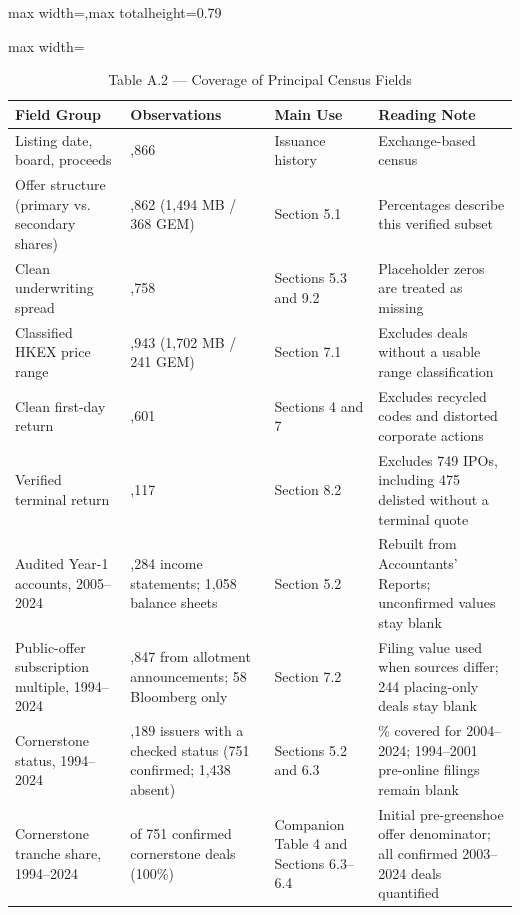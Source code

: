 \documentclass[11pt,letterpaper]{article}
\begin{document}
\begin{table}[!htbp]
\centering
\caption*{Table A.2 — Coverage of Principal Census Fields}
\begin{adjustbox}{max width=\textwidth,max totalheight=0.79\textheight}
\begin{minipage}{\textwidth}\centering
\footnotesize
\setlength{\tabcolsep}{3.5pt}
\renewcommand{\arraystretch}{1.18}
\begin{adjustbox}{max width=\textwidth}
\begin{tabular}{>{\raggedright\arraybackslash}p{3.97cm}>{\centering\arraybackslash}p{4.35cm}>{\raggedright\arraybackslash}p{3.13cm}>{\raggedright\arraybackslash}p{4.35cm}}
\toprule
Field Group & Observations & Main Use & Reading Note \\
\midrule
Listing date, board, proceeds & 2,866 & Issuance history & Exchange-based census \\
Offer structure (primary vs. secondary shares) & 1,862 (1,494 MB / 368 GEM) & Section 5.1 & Percentages describe this verified subset \\
Clean underwriting spread & 1,758 & Sections 5.3 and 9.2 & Placeholder zeros are treated as missing \\
Classified HKEX price range & 1,943 (1,702 MB / 241 GEM) & Section 7.1 & Excludes deals without a usable range classification \\
Clean first-day return & 2,601 & Sections 4 and 7 & Excludes recycled codes and distorted corporate actions \\
Verified terminal return & 2,117 & Section 8.2 & Excludes 749 IPOs, including 475 delisted without a terminal quote \\
Audited Year-1 accounts, 2005–2024 & 1,284 income statements; 1,058 balance sheets & Section 5.2 & Rebuilt from Accountants' Reports; unconfirmed values stay blank \\
Public-offer subscription multiple, 1994–2024 & 1,847 from allotment announcements; 58 Bloomberg only & Section 7.2 & Filing value used when sources differ; 244 placing-only deals stay blank \\
Cornerstone status, 1994–2024 & 2,189 issuers with a checked status (751 confirmed; 1,438 absent) & Sections 5.2 and 6.3 & 100\% covered for 2004–2024; 1994–2001 pre-online filings remain blank \\
Cornerstone tranche share, 1994–2024 & 751 of 751 confirmed cornerstone deals (100\%) & Companion Table 4 and Sections 6.3–6.4 & Initial pre-greenshoe offer denominator; all confirmed 2003–2024 deals quantified \\

\end{tabular}
\end{adjustbox}
\end{minipage}
\end{adjustbox}
\end{table}
\end{document}
